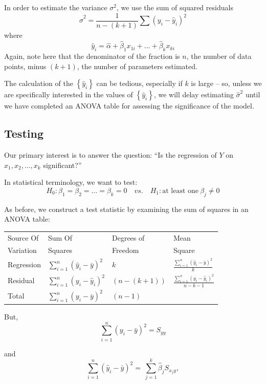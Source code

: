 \documentclass[12pt,a4paper,openany,twoside]{report}
\theoremstyle{definition}
\theoremstyle{remark}
\theoremstyle{plain}
\newcommand{\vsps}{\vspace{.5cm}}
\theoremstyle{definition}
\theoremstyle{definition}
\theoremstyle{definition}
\theoremstyle{remark}
\begin{document}
In order to estimate the variance \(\sigma^{2}\), we use the sum of
squared residuals
\[{\hat{\sigma}}^{2} = \frac{1}{n - (k + 1)}\sum_{}^{}{(y_{i} - {\hat{y}}_{i})^{2}}\]
where
\[{\hat{y}}_{i} = \hat{\alpha} + {\hat{\beta}}_{1}x_{1i} + \ldots + {\hat{\beta}}_{k}x_{ki}\]
Again, note here that the denominator of the fraction is \(n\), the
number of data points, minus \((k + 1)\), the number of parameters
estimated.

The calculation of the \(\left\{ {\hat{y}}_{i} \right\}\) can be
tedious, especially if \(k\) is large -- so, unless we are specifically
interested in the values of \(\left\{ {\hat{y}}_{i} \right\}\), we will
delay estimating \({\hat{\sigma}}^{2}\) until we have completed an ANOVA
table for assessing the significance of the model.

\hypertarget{mlrtesting}{%
\subsection{Testing}\label{mlrtesting}}

Our primary interest is to answer the question: ``Is the regression of
\(Y\) on \(x_{1}, x_{2}, \ldots, x_{k}\) significant?''

In statistical terminology, we want to test:
\[H_{0}:\beta_{1} = \beta_{2} = \ldots = \beta_{k} = 0 \quad vs. \quad H_{1}:\mbox{at least one}\ \beta_{j} \neq 0\]

As before, we construct a test statistic by examining the sum of squares in an ANOVA table:\newline

\begin{longtable}[c]{@{}llll@{}}
\toprule
Source Of & Sum Of & Degrees of & Mean \\
Variation & Squares & Freedom & Square\tabularnewline
\midrule
\endhead
Regression & $\sum_{i = 1}^{n}{(\hat{y}_{i} - \bar{y})}^{2}$ & $k$ & $\frac{ \sum_{i = 1}^{n}{(\hat{y}_{i} - \bar{y})}^{2}}{k}$ \\
Residual & $\sum_{i = 1}^{n}(y_{i} - {\hat{y}}_{i})^{2}$ & $(n - (k+1))$ &  $\frac{\sum_{i = 1}^{n}(y_{i} - {\hat{y}}_{i})^{2}}{n-k-1}$
\tabularnewline
\midrule
Total & $\sum_{i = 1}^{n}{(y_{i} - \bar{y})}^{2}$ &$(n - 1)$ & \tabularnewline
\bottomrule
\end{longtable}
\vsps

But,
\[\sum_{i = 1}^{n}{(y_{i} - \bar{y})}^{2} = S_{yy}\]

and
\[\sum_{i = 1}^{n}{({\hat{y}}_{i} - \bar{y})}^{2} = \ \sum_{j = 1}^{k}{{\hat{\beta}}_{j}S_{x_{j}y}}, \]
\end{document}

